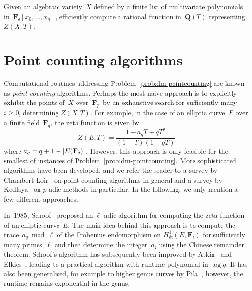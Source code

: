 \begin{prob} \label{prob:dm-pointcounting}
Given an algebraic variety~$X$ defined by a finite list of 
multivariate polynomials in~$\mathbf{F}_{q}[x_0, \dotsc, x_n]$, 
efficiently compute a rational function in~$\mathbf{Q}(T)$ 
representing $Z(X, T)$.
\end{prob}


\section{Point counting algorithms}

Computational routines addressing Problem~\ref{prob:dm-pointcounting} are 
known as \emph{point counting} algorithms.  Perhaps the most naive approach 
is to explicitly exhibit the points of~$X$ over~$\mathbf{F}_{q^i}$ by an 
exhaustive search for sufficiently many $i \geq 0$, determining $Z(X, T)$.  
For example, in the case of an elliptic curve~$E$ over a finite 
field~$\mathbf{F}_{q}$, the zeta function is given by 
\begin{equation*}
Z(E, T) = \frac{1 - a_q T + q T^2}{(1 - T)(1 - q T)}
\end{equation*}
where $a_q = q + 1 - \lvert E(\mathbf{F}_{q})\rvert$.  However, this 
approach is only feasible for the smallest of instances of 
Problem~\ref{prob:dm-pointcounting}.  More sophisticated algorithms 
have been developed, and we refer the reader to a survey by 
Chambert-Loir~\citep{ChambertLoir2008} on point counting algorithms 
in general  and a survey by Kedlaya~\citep{Kedlaya2004} on $p$-adic 
methods in particular.  In the following, we only mention a few 
different approaches.

In~1985, Schoof~\citep{Schoof1985} proposed an $\ell$-adic algorithm for 
computing the zeta function of an elliptic curve~$E$.  The main idea behind 
this approach is to compute the trace~$a_q \bmod{\ell}$ of the Frobenius 
endomorphism on $H_{\text{\'et}}^{1}(E, \mathbf{F}_{\ell})$ for sufficiently 
many primes~$\ell$ and then determine the integer~$a_q$ using the Chinese 
remainder theorem.  Schoof's algorithm has subsequently been improved by 
Atkin~\citep{Atkin1988,Atkin1992} and Elkies~\citep{Elkies1991,Elkies1998}, 
leading to a practical algorithm with runtime polynomial in $\log q$.  
It has also been generalised, for example to higher genus curves by 
Pila~\citep{Pila1990}, however, the runtime remains exponential in the genus.

